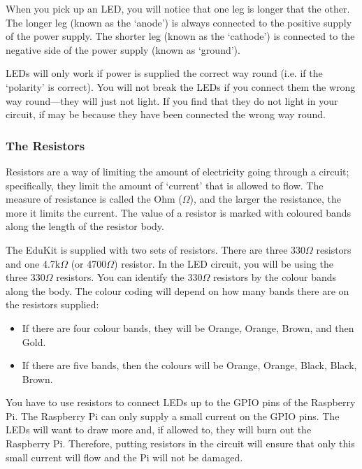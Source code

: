 When you pick up an LED, you will notice that one leg is longer that the other.  The longer leg (known as the `anode') is always connected to the positive supply of the power supply.  The shorter leg (known as the `cathode') is connected to the negative side of the power supply (known as `ground').

LEDs will only work if power is supplied the correct way round (i.e. if the `polarity' is correct).  You will not break the LEDs if you connect them the wrong way round---they will just not light.  If you find that they do not light in your circuit, if may be because they have been connected the wrong way round.

\subsubsection*{The Resistors}


Resistors are a way of limiting the amount of electricity going through a circuit; specifically, they limit the amount of `current' that is allowed to flow.  The measure of resistance is called the Ohm ($\Omega$), and the larger the resistance, the more it limits the current.  The value of a resistor is marked with coloured bands along the length of the resistor body.

The EduKit is supplied with two sets of resistors.  There are three 330$\Omega$ resistors and one 4.7k$\Omega$ (or 4700$\Omega$) resistor.  In the LED circuit, you will be using the three 330$\Omega$ resistors.  You can identify the 330$\Omega$ resistors by the colour bands along the body.  The colour coding will depend on how many bands there are on the resistors supplied:
\begin{itemize}
\item If there are four colour bands, they will be Orange, Orange, Brown, and then Gold.
\item If there are five bands, then the colours will be Orange, Orange, Black, Black, Brown.
\end{itemize}

You have to use resistors to connect LEDs up to the GPIO pins of the Raspberry Pi.  The Raspberry Pi can only supply a small current on the GPIO pins.  The LEDs will want to draw more and, if allowed to, they will burn out the Raspberry Pi.  Therefore, putting resistors in the circuit will ensure that only this small current will flow and the Pi will not be damaged.

